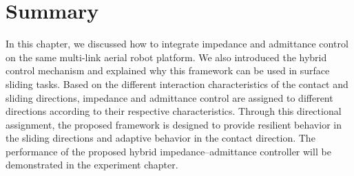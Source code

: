 \section{Summary}
In this chapter, we discussed how to integrate impedance and admittance control on the same multi-link aerial robot platform. We also introduced the hybrid control mechanism and explained why this framework can be used in surface sliding tasks. Based on the different interaction characteristics of the contact and sliding directions, impedance and admittance control are assigned to different directions according to their respective characteristics. Through this directional assignment, the proposed framework is designed to provide resilient behavior in the sliding directions and adaptive behavior in the contact direction. The performance of the proposed hybrid impedance--admittance controller will be demonstrated in the experiment chapter.








